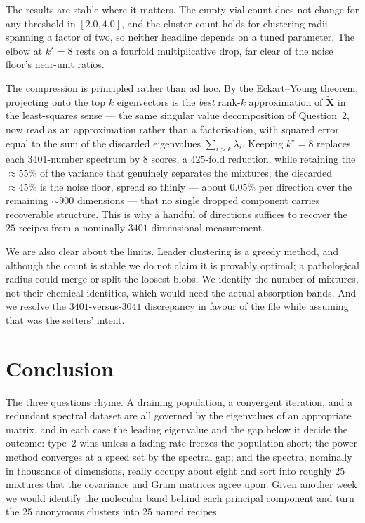 \documentclass[12pt,a4paper]{article}
\theoremstyle{definition}
\newcommand{\Xt}{\widetilde{\mathbf X}}
\begin{document}
The results are stable where it matters. The empty-vial count does not change for any threshold in
$[2.0,4.0]$, and the cluster count holds for clustering radii spanning a factor of two, so neither
headline depends on a tuned parameter. The elbow at $k^\star=8$ rests on a fourfold multiplicative
drop, far clear of the noise floor's near-unit ratios.

The compression is principled rather than ad hoc. By the Eckart--Young theorem, projecting onto the
top $k$ eigenvectors is the \emph{best} rank-$k$ approximation of $\Xt$ in the least-squares sense
--- the same singular value decomposition of Question~2, now read as an approximation rather than a
factorisation, with squared error equal to the sum of the discarded eigenvalues $\sum_{i>k}\lambda_i$.
Keeping $k^\star=8$ replaces each $3401$-number spectrum by $8$ scores, a $425$-fold reduction, while
retaining the $\approx55\%$ of the variance that genuinely separates the mixtures; the discarded
$\approx45\%$ is the noise floor, spread so thinly --- about $0.05\%$ per direction over the
remaining ${\sim}900$ dimensions --- that no single dropped component carries recoverable structure.
This is why a handful of directions suffices to recover the $25$ recipes from a nominally
$3401$-dimensional measurement.

We are also clear about the limits. Leader clustering is a greedy method, and although the count is
stable we do not claim it is provably optimal; a pathological radius could merge or split the loosest
blobs. We identify the number of mixtures, not their chemical identities, which would need the actual
absorption bands. And we resolve the $3401$-versus-$3041$ discrepancy in favour of the file while
assuming that was the setters' intent.

\section{Conclusion}
The three questions rhyme. A draining population, a convergent iteration, and a redundant spectral
dataset are all governed by the eigenvalues of an appropriate matrix, and in each case the leading
eigenvalue and the gap below it decide the outcome: type~2 wins unless a fading rate freezes the
population short; the power method converges at a speed set by the spectral gap; and the spectra,
nominally in thousands of dimensions, really occupy about eight and sort into roughly $25$ mixtures
that the covariance and Gram matrices agree upon. Given another week we would identify the molecular
band behind each principal component and turn the $25$ anonymous clusters into $25$ named recipes.
\end{document}
